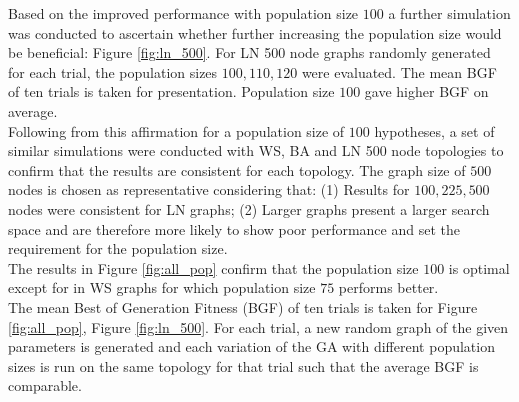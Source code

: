 \documentclass[
	a4paper, %
	10pt, %
	unnumberedsections, %
	twoside, %
]{LTJournalArticle}
\begin{document}
Based on the improved performance with population size \(100\) a further simulation was conducted to ascertain whether further increasing the population size would be beneficial: Figure \ref{fig:ln_500}. For LN 500 node graphs randomly generated for each trial, the population sizes \(100, 110, 120\) were evaluated. The mean BGF of ten trials is taken for presentation. Population size \(100\) gave higher BGF on average. \\
Following from this affirmation for a population size of \(100\) hypotheses, a set of similar simulations were conducted with WS, BA and LN 500 node topologies to confirm that the results are consistent for each topology. The graph size of \(500\) nodes is chosen as representative considering that: (1) Results for \(100, 225, 500\) nodes were consistent for LN graphs; (2) Larger graphs present a larger search space and are therefore more likely to show poor performance and set the requirement for the population size.\\
The results in Figure \ref{fig:all_pop} confirm that the population size \(100\) is optimal except for in WS graphs for which population size \(75\) performs better.\\
The mean Best of Generation Fitness (BGF) of ten trials is taken for Figure \ref{fig:all_pop}, Figure \ref{fig:ln_500}. For each trial, a new random graph of the given parameters is generated and each variation of the GA with different population sizes is run on the same topology for that trial such that the average BGF is comparable. \\ 
\end{document}
